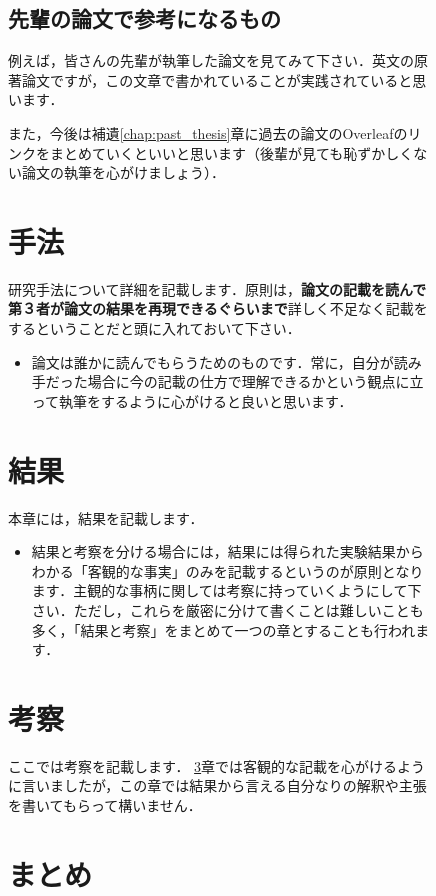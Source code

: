 \documentclass[dvipdfmx,autodetect-engine]{jsreport}
\begin{document}
\begin{figure}[h]
{\section{先輩の論文で参考になるもの}

例えば，皆さんの先輩が執筆した論文\cite{pmid29315213,pmid29040374}を見てみて下さい．英文の原著論文ですが，この文章で書かれていることが実践されていると思います．

また，今後は補遺\ref{chap:past_thesis}章に過去の論文のOverleafのリンクをまとめていくといいと思います（後輩が見ても恥ずかしくない論文の執筆を心がけましょう）．

\chapter{手法}

研究手法について詳細を記載します．原則は，\textbf{論文の記載を読んで第３者が論文の結果を再現できるぐらいまで}詳しく不足なく記載をするということだと頭に入れておいて下さい．

\begin{itemize}
\item 論文は誰かに読んでもらうためのものです．常に，自分が読み手だった場合に今の記載の仕方で理解できるかという観点に立って執筆をするように心がけると良いと思います．
\end{itemize}

\chapter{結果}\label{sec:result}

本章には，結果を記載します．
\begin{itemize}
\item 結果と考察を分ける場合には，結果には得られた実験結果からわかる「客観的な事実」のみを記載するというのが原則となります．主観的な事柄に関しては考察に持っていくようにして下さい．ただし，これらを厳密に分けて書くことは難しいことも多く，「結果と考察」をまとめて一つの章とすることも行われます．
\end{itemize}

\chapter{考察}

ここでは考察を記載します．
\ref{sec:result}章では客観的な記載を心がけるように言いましたが，この章では結果から言える自分なりの解釈や主張を書いてもらって構いません．

\chapter{まとめ}

}
\end{figure}
\end{document}
